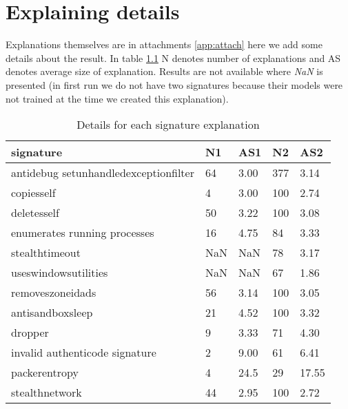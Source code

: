 \chapter{Explaining details} \label{app:expl}
Explanations themselves are in attachments \ref{app:attach} here we add some details about the result. In table \ref{tab:expdet} N denotes number of explanations and AS denotes average size of explanation. Results are not available where \emph{NaN} is presented (in first run we do not have two signatures because their models were not trained at the time we created this explanation).

\begin{table}[h]
    \centering
    \caption{Details for each signature explanation}
    \begin{tabular}{lllll}
      \toprule
      \textbf{signature} &
      \textbf{N1} &
      \textbf{AS1} &
      \textbf{N2} &
      \textbf{AS2}
      \\
      \midrule
      antidebug setunhandledexceptionfilter & 64 & 3.00 & 377 & 3.14  \\
      \midrule
      copiesself & 4 & 3.00 & 100 & 2.74 \\
      \midrule
      deletesself & 50 & 3.22 & 100 & 3.08 \\
      \midrule
      enumerates running processes & 16 & 4.75 & 84 & 3.33 \\
      \midrule
      stealthtimeout & NaN & NaN & 78 &  3.17 \\
      \midrule
      useswindowsutilities & NaN & NaN & 67 &  1.86 \\
      \midrule
      removeszoneidads & 56 & 3.14 & 100 & 3.05 \\
      \midrule
      antisandboxsleep & 21 & 4.52 & 100 & 3.32 \\
      \midrule
      dropper & 9 & 3.33 & 71 & 4.30 \\
      \midrule
      invalid authenticode signature & 2 & 9.00 & 61 & 6.41 \\
      \midrule
      packerentropy & 4 & 24.5 & 29 & 17.55 \\
      \midrule
      stealthnetwork & 44 & 2.95 & 100 & 2.72 \\
      \bottomrule
    \end{tabular}
    \label{tab:expdet}
  \end{table}